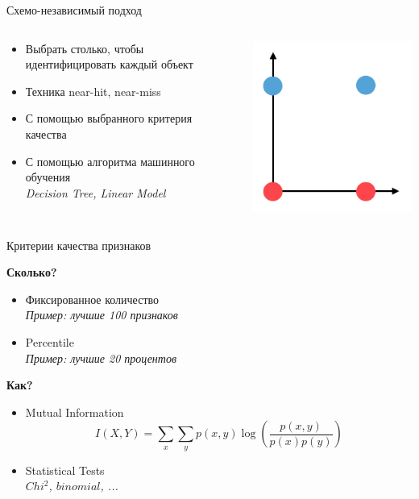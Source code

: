 \documentclass[10pt,a4paper]{beamer}
\begin{document}

\begin{frame}{Схемо-независимый подход}

\begin{columns}[T]
    \begin{column}{.5\textwidth} 
	\begin{itemize}
	\item Выбрать столько, чтобы идентифицировать каждый объект
	\item Техника near-hit, near-miss
	\item С помощью выбранного критерия качества
	\item С помощью алгоритма машинного обучения \\
	{\it Decision Tree, Linear Model}	
	\end{itemize}
    \end{column}
    \begin{column}{.5\textwidth} 
	\begin{center}
	\includegraphics[scale=0.3]{images/hit-miss.png}
	\end{center}  
    \end{column}
\end{columns}

\end{frame}


\begin{frame}{Критерии качества признаков}

{\bf Сколько?}
\begin{itemize}
\item Фиксированное количество \\
{\it Пример: лучшие 100 признаков}
\item Percentile \\
{\it Пример: лучшие 20 процентов}
\end{itemize}

{\bf Как?}
\begin{itemize}
\item Mutual Information
\[
I(X, Y) = \sum_x \sum_y p(x, y) \log \left( \frac{p(x, y)}{p(x) p(y)} \right)
\]
\item Statistical Tests \\
{\it $Chi^2$, $binomial$, ...}
\end{itemize}

\end{frame}
\end{document}

